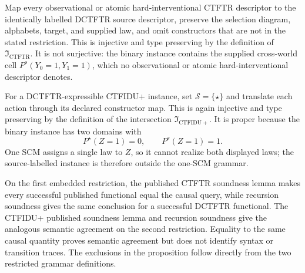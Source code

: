 Map every observational or atomic hard-interventional CTFTR descriptor to the identically labelled DCTFTR source descriptor, preserve the selection diagram, alphabets, target, and supplied law, and omit constructors that are not in the stated restriction.  This is injective and type preserving by the definition of \(\mathfrak I_{\mathrm{CTFTR}}\).  It is not surjective: the binary instance contains the supplied cross-world cell \(P^s(Y_0=1,Y_1=1)\), which no observational or atomic hard-interventional descriptor denotes.

For a DCTFTR-expressible CTFIDU+ instance, set \(\mathcal S=\{\star\}\) and translate each action through its declared constructor map.  This is again injective and type preserving by the definition of the intersection \(\mathfrak I_{\mathrm{CTFIDU+}}\).  It is proper because the binary instance has two domains with
\[
P^\star(Z=1)=0,
\qquad P^s(Z=1)=1.
\]
One SCM assigns a single law to \(Z\), so it cannot realize both displayed laws; the source-labelled instance is therefore outside the one-SCM grammar.

On the first embedded restriction, the published CTFTR soundness lemma makes every successful published functional equal the causal query, while recursion soundness gives the same conclusion for a successful DCTFTR functional.  The CTFIDU+ published soundness lemma and recursion soundness give the analogous semantic agreement on the second restriction.  Equality to the same causal quantity proves semantic agreement but does not identify syntax or transition traces.  The exclusions in the proposition follow directly from the two restricted grammar definitions.
